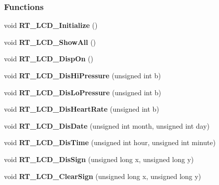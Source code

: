 \subsubsection*{Functions}
\begin{DoxyCompactItemize}
\item 
\mbox{\label{a00017_a0dcb20ce437050371f6f951d0b5ef76a}} 
void {\bfseries R\+T\+\_\+\+L\+C\+D\+\_\+\+Initialize} ()
\item 
\mbox{\label{a00017_ae4b1a16d55b25d4399938ed45cb492b0}} 
void {\bfseries R\+T\+\_\+\+L\+C\+D\+\_\+\+Show\+All} ()
\item 
\mbox{\label{a00017_a229a06db9b02ce305d2007597149aa3e}} 
void {\bfseries R\+T\+\_\+\+L\+C\+D\+\_\+\+Disp\+On} ()
\item 
\mbox{\label{a00017_aaea4bf785863188e99506f7f7db0968c}} 
void {\bfseries R\+T\+\_\+\+L\+C\+D\+\_\+\+Dis\+Hi\+Pressure} (unsigned int b)
\item 
\mbox{\label{a00017_aa0e75dacbbd9e6fa57d1fefe38991724}} 
void {\bfseries R\+T\+\_\+\+L\+C\+D\+\_\+\+Dis\+Lo\+Pressure} (unsigned int b)
\item 
\mbox{\label{a00017_a4b25d02612294de809d7c050355cd2c6}} 
void {\bfseries R\+T\+\_\+\+L\+C\+D\+\_\+\+Dis\+Heart\+Rate} (unsigned int b)
\item 
\mbox{\label{a00017_ac08c4b5025177f813b272d1f8eb7c93b}} 
void {\bfseries R\+T\+\_\+\+L\+C\+D\+\_\+\+Dis\+Date} (unsigned int month, unsigned int day)
\item 
\mbox{\label{a00017_a61de25a67c91d6f79091c8e1d066079c}} 
void {\bfseries R\+T\+\_\+\+L\+C\+D\+\_\+\+Dis\+Time} (unsigned int hour, unsigned int minute)
\item 
\mbox{\label{a00017_aa6c4e55c2ea0f14c24d42f0b0750988e}} 
void {\bfseries R\+T\+\_\+\+L\+C\+D\+\_\+\+Dis\+Sign} (unsigned long x, unsigned long y)
\item 
\mbox{\label{a00017_a89c88a4205200633eb22b6ec94b9f1b6}} 
void {\bfseries R\+T\+\_\+\+L\+C\+D\+\_\+\+Clear\+Sign} (unsigned long x, unsigned long y)

\end{DoxyCompactItemize}
